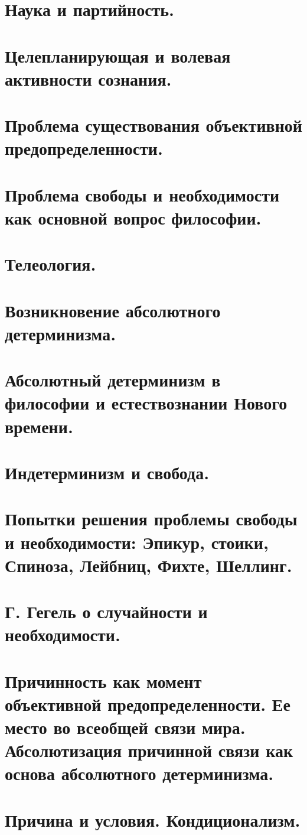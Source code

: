 \section{ Наука и партийность.}
\section{ Целепланирующая и волевая активности сознания.}
\section{ Проблема существования объективной предопределенности.}
\section{ Проблема свободы и необходимости как основной вопрос философии.}
\section{ Телеология.}
\section{ Возникновение абсолютного детерминизма.}
\section{ Абсолютный детерминизм в философии и естествознании Нового времени.}
\section{ Индетерминизм и свобода.}
\section{ Попытки решения проблемы свободы и необходимости: Эпикур, стоики, Спиноза, Лейбниц, Фихте, Шеллинг.}
\section{ Г. Гегель о случайности и необходимости.}
\section{ Причинность как момент объективной предопределенности. Ее место во всеобщей связи мира. Абсолютизация причинной связи как основа абсолютного детерминизма.}
\section{ Причина и условия. Кондиционализм.}
